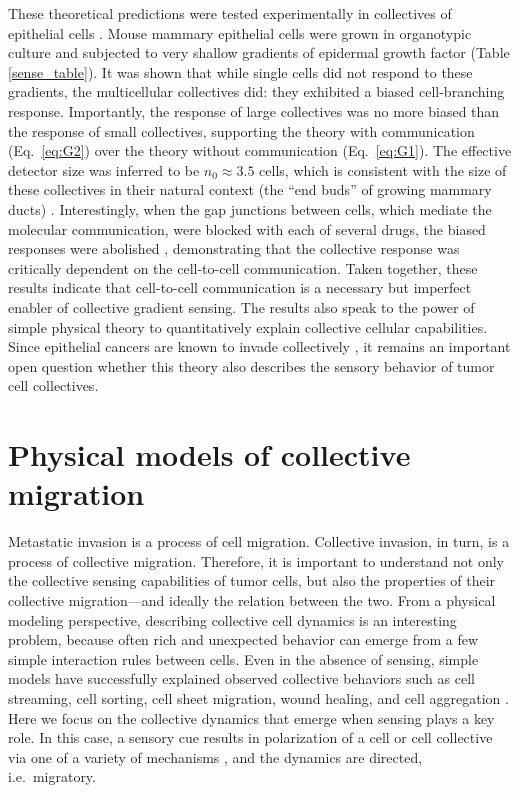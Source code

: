 These theoretical predictions were tested experimentally in collectives of epithelial cells \cite{ellison2016cell}. Mouse mammary epithelial cells were grown in organotypic culture and subjected to very shallow gradients of epidermal growth factor (Table \ref{sense_table}). It was shown that while single cells did not respond to these gradients, the multicellular collectives did: they exhibited a biased cell-branching response. Importantly, the response of large collectives was no more biased than the response of small collectives, supporting the theory with communication (Eq.\ \ref{eq:G2}) over the theory without communication (Eq.\ \ref{eq:G1}). The effective detector size was inferred to be $n_0 \approx 3.5$ cells, which is consistent with the size of these collectives in their natural context (the ``end buds'' of growing mammary ducts) \cite{lu2008genetic}. Interestingly, when the gap junctions between cells, which mediate the molecular communication, were blocked with each of several drugs, the biased responses were abolished \cite{ellison2016cell}, demonstrating that the collective response was critically dependent on the cell-to-cell communication. Taken together, these results indicate that cell-to-cell communication is a necessary but imperfect enabler of collective gradient sensing. The results also speak to the power of simple physical theory to quantitatively explain collective cellular capabilities. Since epithelial cancers are known to invade collectively \cite{cheung2013collective}, it remains an important open question whether this theory also describes the sensory behavior of tumor cell collectives.

\section{Physical models of collective migration}

Metastatic invasion is a process of cell migration. Collective invasion, in turn, is a process of collective migration. Therefore, it is important to understand not only the collective sensing capabilities of tumor cells, but also the properties of their collective migration---and ideally the relation between the two. From a physical modeling perspective, describing collective cell dynamics is an interesting problem, because often rich and unexpected behavior can emerge from a few simple interaction rules between cells. Even in the absence of sensing, simple models have successfully explained observed collective behaviors such as cell streaming, cell sorting, cell sheet migration, wound healing, and cell aggregation \cite{kabla2012collective,szabo2010collective,basan2013alignment,janulevicius2015short}. Here we focus on the collective dynamics that emerge when sensing plays a key role. In this case, a sensory cue results in polarization of a cell or cell collective via one of a variety of mechanisms \cite{jilkine2011comparison}, and the dynamics are directed, i.e.\ migratory.

